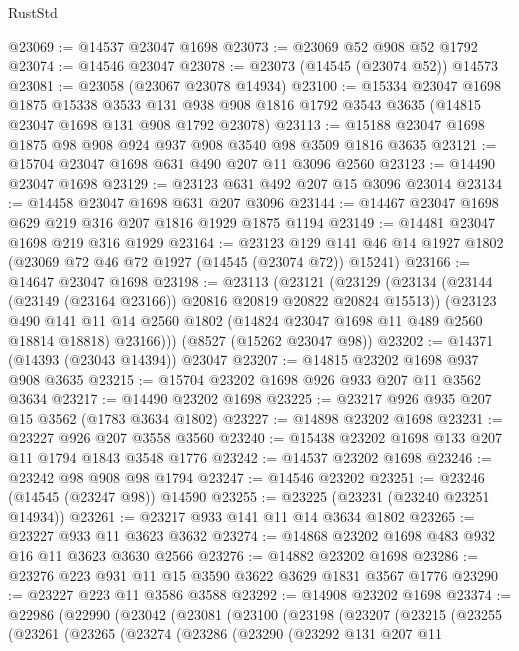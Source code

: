 \begin{lexlean}{RustStd}
\begin{coremodule}
@23069 := @14537 @23047 @1698
@23073 := @23069 @52 @908 @52 @1792
@23074 := @14546 @23047
@23078 := @23073 (@14545 (@23074 @52)) @14573
@23081 := @23058 (@23067 @23078 @14934)
@23100 := @15334
    @23047
    @1698
    @1875
    @15338
    @3533
    @131
    @938
    @908
    @1816
    @1792
    @3543
    @3635
    (@14815 @23047 @1698 @131 @908 @1792 @23078)
@23113 := @15188 @23047 @1698 @1875 @98 @908 @924 @937 @908 @3540 @98 @3509 @1816 @3635
@23121 := @15704 @23047 @1698 @631 @490 @207 @11 @3096 @2560
@23123 := @14490 @23047 @1698
@23129 := @23123 @631 @492 @207 @15 @3096 @23014
@23134 := @14458 @23047 @1698 @631 @207 @3096
@23144 := @14467 @23047 @1698 @629 @219 @316 @207 @1816 @1929 @1875 @1194
@23149 := @14481 @23047 @1698 @219 @316 @1929
@23164 := @23123
    @129
    @141
    @46
    @14
    @1927
    @1802
    (@23069 @72 @46 @72 @1927 (@14545 (@23074 @72)) @15241)
@23166 := @14647 @23047 @1698
@23198 := @23113
    (@23121
      (@23129
        (@23134 (@23144 (@23149 (@23164 @23166)) @20816 @20819 @20822 @20824 @15513))
        (@23123
          @490
          @141
          @11
          @14
          @2560
          @1802
          (@14824 @23047 @1698 @11 @489 @2560 @18814 @18818)
          @23166)))
    (@8527 (@15262 @23047 @98))
@23202 := @14371 (@14393 (@23043 @14394)) @23047
@23207 := @14815 @23202 @1698 @937 @908 @3635
@23215 := @15704 @23202 @1698 @926 @933 @207 @11 @3562 @3634
@23217 := @14490 @23202 @1698
@23225 := @23217 @926 @935 @207 @15 @3562 (@1783 @3634 @1802)
@23227 := @14898 @23202 @1698
@23231 := @23227 @926 @207 @3558 @3560
@23240 := @15438 @23202 @1698 @133 @207 @11 @1794 @1843 @3548 @1776
@23242 := @14537 @23202 @1698
@23246 := @23242 @98 @908 @98 @1794
@23247 := @14546 @23202
@23251 := @23246 (@14545 (@23247 @98)) @14590
@23255 := @23225 (@23231 (@23240 @23251 @14934))
@23261 := @23217 @933 @141 @11 @14 @3634 @1802
@23265 := @23227 @933 @11 @3623 @3632
@23274 := @14868 @23202 @1698 @483 @932 @16 @11 @3623 @3630 @2566
@23276 := @14882 @23202 @1698
@23286 := @23276 @223 @931 @11 @15 @3590 @3622 @3629 @1831 @3567 @1776
@23290 := @23227 @223 @11 @3586 @3588
@23292 := @14908 @23202 @1698
@23374 := @22986
    (@22990
      (@23042
        (@23081
          (@23100
            (@23198
              (@23207
                (@23215
                  (@23255
                    (@23261
                      (@23265
                        (@23274
                          (@23286
                            (@23290
                              (@23292
                                @131
                                @207
                                @11

\end{coremodule}
\end{lexlean}
